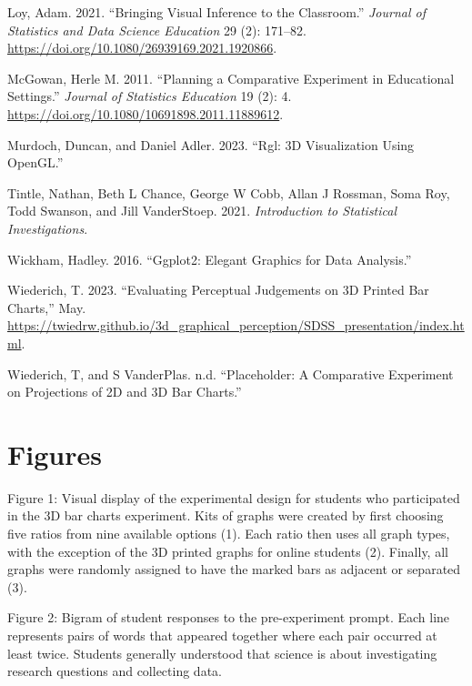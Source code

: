 \documentclass[
  12pt,
]{article}
\newlength{\cslhangindent}
\newenvironment{CSLReferences}[2] %
 {\begin{list}{}{%
  \setlength{\itemindent}{0pt}
  \setlength{\leftmargin}{0pt}
  \setlength{\parsep}{0pt}
  \ifodd #1
   \setlength{\leftmargin}{\cslhangindent}
   \setlength{\itemindent}{-1\cslhangindent}
  \fi
  \setlength{\itemsep}{#2\baselineskip}}}
 {\end{list}}
\begin{document}
\begin{CSLReferences}{1}{0}
Loy, Adam. 2021. {``Bringing Visual Inference to the Classroom.''}
\emph{Journal of Statistics and Data Science Education} 29 (2): 171--82.
\url{https://doi.org/10.1080/26939169.2021.1920866}.

McGowan, Herle M. 2011. {``Planning a Comparative Experiment in
Educational Settings.''} \emph{Journal of Statistics Education} 19 (2):
4. \url{https://doi.org/10.1080/10691898.2011.11889612}.

Murdoch, Duncan, and Daniel Adler. 2023. {``Rgl: 3D Visualization Using
OpenGL.''}

Tintle, Nathan, Beth L Chance, George W Cobb, Allan J Rossman, Soma Roy,
Todd Swanson, and Jill VanderStoep. 2021. \emph{Introduction to
Statistical Investigations}.

Wickham, Hadley. 2016. {``Ggplot2: Elegant Graphics for Data
Analysis.''}

Wiederich, T. 2023. {``Evaluating Perceptual Judgements on 3D Printed
Bar Charts,''} May.
\url{https://twiedrw.github.io/3d_graphical_perception/SDSS_presentation/index.html}.

Wiederich, T, and S VanderPlas. n.d. {``Placeholder: A Comparative
Experiment on Projections of 2D and 3D Bar Charts.''}

\end{CSLReferences}

\newpage

\section{Figures}\label{figures}

Figure 1: Visual display of the experimental design for students who
participated in the 3D bar charts experiment. Kits of graphs were
created by first choosing five ratios from nine available options (1).
Each ratio then uses all graph types, with the exception of the 3D
printed graphs for online students (2). Finally, all graphs were
randomly assigned to have the marked bars as adjacent or separated (3).

Figure 2: Bigram of student responses to the pre-experiment prompt. Each
line represents pairs of words that appeared together where each pair
occurred at least twice. Students generally understood that science is
about investigating research questions and collecting data.
\end{document}
